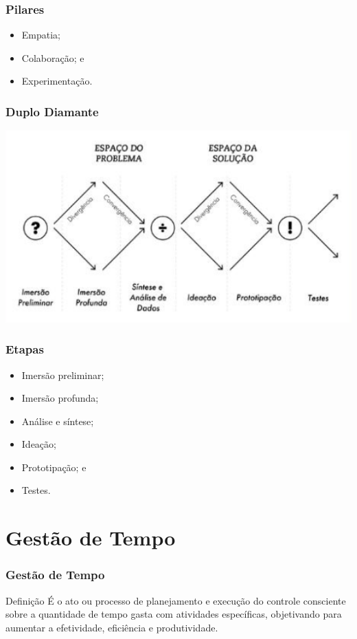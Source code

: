 \documentclass[aspectratio=169]{beamer}
\begin{document}
\begin{frame}
	\frametitle{Pilares}

	\begin{itemize}
		\item Empatia;
		\item Colabora\c cão; e
		\item Experimenta\c cão.
	\end{itemize}
\end{frame}

\begin{frame}
	\frametitle{Duplo Diamante}
	
	\begin{center}
		\includegraphics[scale=0.5]{img/design_thinking}
	\end{center}
\end{frame}

\begin{frame}
	\frametitle{Etapas}

	\begin{itemize}
		 \item Imersão preliminar;
		 \item Imersão profunda;
		 \item Análise e síntese;
		 \item Idea\c cão;
		 \item Prototipa\c cão; e
		 \item Testes.
	\end{itemize}
\end{frame}

\section{Gestão de Tempo}

\begin{frame}
	\frametitle{Gestão de Tempo}

	\begin{block}{Defini\c cão}
		 É o ato ou processo de planejamento e execução do controle consciente sobre a quantidade de tempo gasta com atividades específicas, objetivando para aumentar a efetividade, eficiência e produtividade.
	\end{block}
\end{frame}
\end{document}
